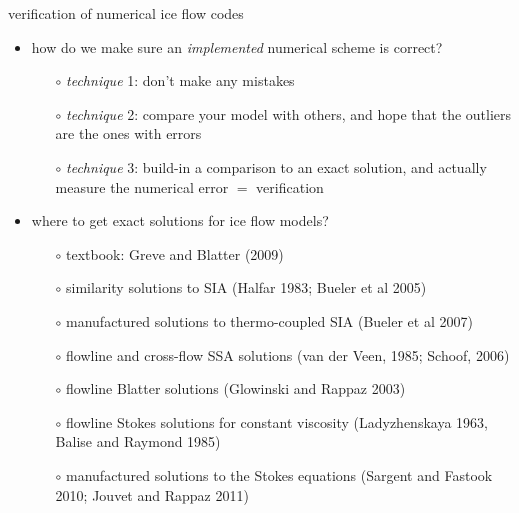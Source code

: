 \begin{frame}{verification of numerical ice flow codes}
\begin{itemize}
\item how do we make sure an \emph{implemented} numerical scheme is correct?
  \begin{itemize}
  \item[$\circ$] \emph{technique} 1: don't make any mistakes
  \item[$\circ$] \emph{technique} 2: compare your model with others, and hope that the outliers are the ones with errors
  \item[$\circ$] \emph{technique} 3: build-in a comparison to an exact solution, and actually measure the numerical error \alert{$=$ verification}
  \end{itemize}
\item where to get exact solutions for ice flow models?
  \begin{itemize}
  \item[$\circ$] textbook: Greve and Blatter (2009)\nocite{GreveBlatter2009}
  \item[$\circ$] similarity solutions to SIA (Halfar 1983\nocite{Halfar83}; Bueler et al 2005\nocite{BLKCB})
  \item[$\circ$] manufactured solutions to thermo-coupled SIA (Bueler et al 2007\nocite{BBL})
  \item[$\circ$] flowline and cross-flow SSA solutions (van der Veen, 1985; Schoof, 2006)\nocite{SchoofStream,vanderVeen85}
  \item[$\circ$] flowline Blatter solutions (Glowinski and Rappaz 2003)\nocite{GlowinskiRappaz}
  \item[$\circ$] flowline Stokes solutions for constant viscosity (Ladyzhenskaya 1963\nocite{Ladyzhenskaya}, Balise and Raymond 1985\nocite{BaliseRaymond1985})
  \item[$\circ$] manufactured solutions to the Stokes equations (Sargent and Fastook 2010; Jouvet and Rappaz 2011)\nocite{JouvetRappaz2011,SargentFastook2010}
  \end{itemize}
\end{itemize}
\end{frame}


